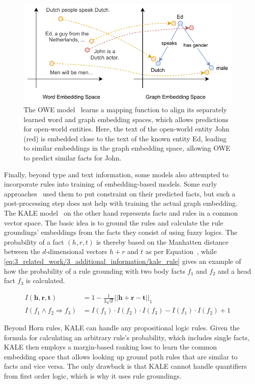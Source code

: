\begin{figure}[t]
    \centering
    \includegraphics{3_related_work/3_additional_information/owe}
    \caption{The OWE model~\cite{Shah2019AnOE} learns a mapping function to align its separately learned word and graph embedding spaces, which allows predictions for open-world entities. Here, the text of the open-world entity John (red) is embedded close to the text of the known entity Ed, leading to similar embeddings in the graph embedding space, allowing OWE to predict similar facts for John.}
    \label{fig:3_related_work/3_additional_information/owe}
\end{figure}

Finally, beyond type and text information, some models also attempted to incorporate rules into training of embedding-based models. Some early approaches~\cite{Wang2015KnowledgeBC, Wei2015LargescaleKB} used them to put constraint on their predicted facts, but such a post-processing step does not help with training the actual graph embedding. The KALE model~\cite{Guo2016JointlyEK} on the other hand represents facts and rules in a common vector space. The basic idea is to ground the rules and calculate the rule groundings' embeddings from the facts they consist of using fuzzy logics. The probability of a fact $(h, r, t)$ is thereby based on the Manhatten distance between the $d$-dimensional vectors $h + r$ and $t$ as per Equation~\cite{eq:3_related_work/3_additional_information/kale_fac}, while \autoref{eq:3_related_work/3_additional_information/kale_rule} gives an example of how the probability of a rule grounding with two body facts $f_1$ and $f_2$ and a head fact $f_3$ is calculated.

\begin{align}
    I(\textbf{h}, \textbf{r}, \textbf{t}) &= 1 - \frac{1}{3 \sqrt {d}} {|| \textbf{h} + \textbf{r} - \textbf{t} ||}_1
    \label{eq:3_related_work/3_additional_information/kale_fact} \\
    I(f_1 \land f_2 \Rightarrow f_3) &= I(f_1) \cdot I(f_2) \cdot I(f_3) - I(f_1) \cdot I(f_2) + 1
    \label{eq:3_related_work/3_additional_information/kale_rule}
\end{align}

Beyond Horn rules, KALE can handle any propositional logic rules. Given the formula for calculating an arbitrary rule's probability, which includes single facts, KALE then employs a margin-based ranking loss to learn the common embedding space that allows looking up ground path rules that are similar to facts and vice versa. The only drawback is that KALE cannot handle quantifiers from first order logic, which is why it uses rule groundings.
